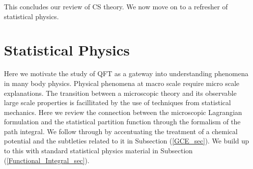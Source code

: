 This concludes our review of CS theory. We now move on to a refresher of statistical physics.


        \section{Statistical Physics}

        Here we motivate the study of QFT as a gateway into understanding phenomena in many body physics. Physical phenomena at macro scale require micro scale explanations. The transition between a microscopic theory and its observable large scale properties is facillitated by the use of techniques from statistical mechanics. Here we review the connection between the microscopic Lagrangian formulation and the statistical partition function through the formalism of the path integral. We follow through by accentuating the treatment of a chemical potential and the subtleties related to it in Subsection (\ref{GCE_sec}). We build up to this with standard statistical physics material in Subsection (\ref{Functional_Integral_sec}).


